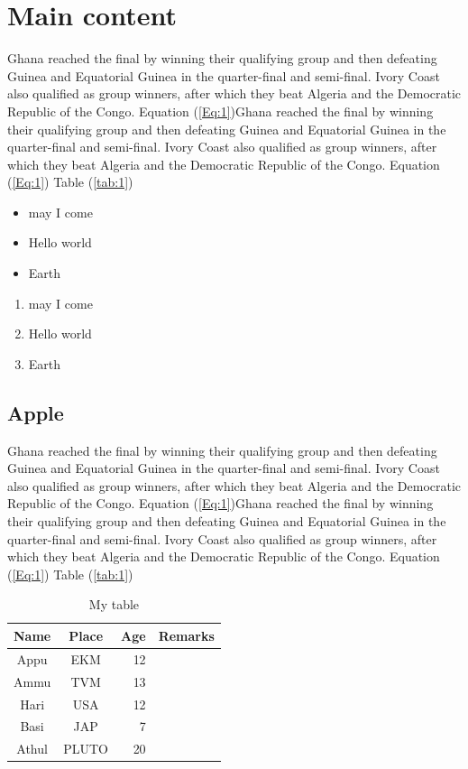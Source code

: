 \documentclass[11pt,a4]{report}
\begin{document}
\section{Main content}
Ghana reached the final by winning their qualifying group and then defeating Guinea and Equatorial Guinea in the quarter-final and semi-final. Ivory Coast also qualified as group winners, after which they beat Algeria and the Democratic Republic of the Congo. Equation (\ref{Eq:1})Ghana reached the final by winning their qualifying group and then defeating Guinea and Equatorial Guinea in the quarter-final and semi-final. Ivory Coast also qualified as group winners, after which they beat Algeria and the Democratic Republic of the Congo. Equation (\ref{Eq:1}) Table (\ref{tab:1})

\begin{itemize}
	\item may I come
	\item Hello world
	\item Earth
\end{itemize}

\begin{enumerate}
	\item may I come
	\item Hello world
	\item Earth
\end{enumerate}



\subsection{Apple}
Ghana reached the final \cite{PhysRevLett.128.057702} by winning their qualifying group and then defeating Guinea and Equatorial Guinea in the quarter-final and semi-final. Ivory Coast also qualified as group winners, after which they beat Algeria and the Democratic Republic of the Congo. Equation (\ref{Eq:1})Ghana reached the final by winning their qualifying group and then defeating Guinea and Equatorial Guinea in the quarter-final and semi-final. Ivory Coast also qualified as group winners, after which they beat Algeria and the Democratic Republic of the Congo. Equation (\ref{Eq:1}) Table (\ref{tab:1}) \cite{PhysRevLett.128.057702}
\begin{table}[h]
	\begin{center}
		\begin{tabular}{|c|c|r|c|}
			\hline
			\rule[-1ex]{0pt}{2.5ex} Name & Place & Age & Remarks \\
			\hline
			\rule[-1ex]{0pt}{2.5ex} Appu & EKM & 12 &  \\
			\hline
			\rule[-1ex]{0pt}{2.5ex} Ammu & TVM & 13 &  \\
			\hline
			\rule[-1ex]{0pt}{2.5ex} Hari & USA &12  &  \\
			\hline
			\rule[-1ex]{0pt}{2.5ex} Basi & JAP  & 7 &  \\
			\hline
			\rule[-1ex]{0pt}{2.5ex} Athul & PLUTO & 20 &  \\
			\hline
		\end{tabular}
	\end{center}
	\caption{My table}
	\label{tab:2}
\end{table}






\end{document}
